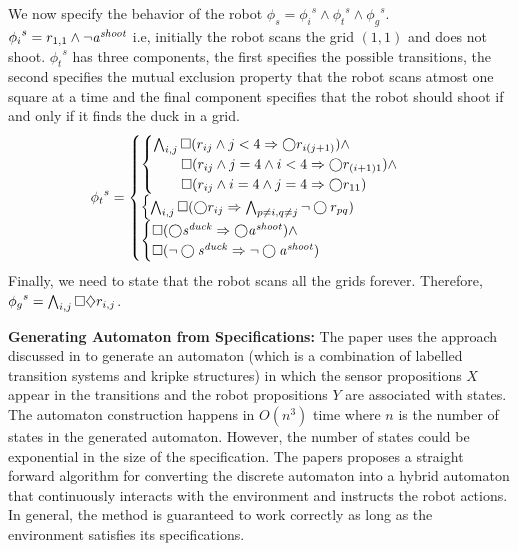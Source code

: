 We now specify the behavior of the robot $\phi_s = {\phi_i}^s \wedge {\phi_t}^s \wedge {\phi_g}^s$.
${\phi_i}^s = r_{1,1} \wedge \neg \mathit{a^{shoot}}$ i.e, initially the robot scans the grid $(1,1)$ and does not shoot.
${\phi_t}^s$ has three components, the first specifies the possible transitions, the second specifies the
mutual exclusion property that the robot scans atmost one square at a time and the final component 
specifies that the robot should shoot if and only if it finds the duck in a grid.
%
\begin{align*}
{\phi_t}^s = 
\begin{cases}
\begin{cases}
\bigwedge_{i,j} \always (r_{ij} \wedge j < 4 \Rightarrow \next r_{i(j+1)}) \wedge  \\
\qquad  \always (r_{ij} \wedge j=4 \wedge i<4 \Rightarrow \next r_{(i+1)1}) \wedge  \\
\qquad \always (r_{ij} \wedge i=4 \wedge j=4 \Rightarrow \next r_{11}) 
\end{cases} \\
%
\begin{cases}
\bigwedge_{i,j} \always (\next r_{ij} \Rightarrow \bigwedge_{p \ne i,q \ne j} \neg \next r_{pq})
\end{cases} \\
%
\begin{cases}
\always (\next \duck \Rightarrow \next \shoot) \wedge \\
\always (\neg \next \duck \Rightarrow \neg \next \shoot) 
\end{cases} 
\end{cases}
\end{align*}
%
Finally, we need to state that the robot scans all the grids forever. Therefore, 
${\phi_g}^s = \bigwedge_{i,j} \square \diamondsuit r_{i,j}$.

\textbf{Generating Automaton from Specifications:}
The paper uses the approach discussed in \cite{pnueli:VMCAI06} to generate an automaton (which is a combination
of labelled transition systems and kripke structures) in which the sensor propositions $X$ appear 
in the transitions and the robot propositions $Y$ are associated with states. 
The automaton construction happens in $O(n^3)$ time where $n$ is the number of states in the generated
automaton. However, the number of states could be exponential in the size of the specification.
The papers proposes a straight forward algorithm for converting the discrete automaton into a
hybrid automaton that continuously interacts with the environment and instructs the robot actions.
In general, the method is guaranteed to work correctly as long as the environment satisfies its specifications.

